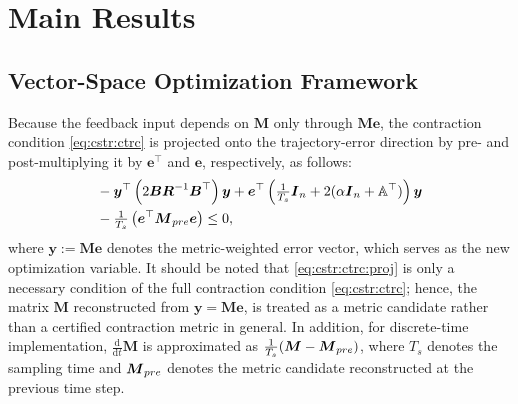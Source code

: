 \documentclass{ifacconf}
\newcommand*{\mv}[1]{\boldsymbol{#1}} %
\newcommand*{\mm}[1]{\boldsymbol{#1}} %
\newcommand\der{\mathrm d}
\newcommand*{\ddtt}{
   \tfrac{\der}{\der t}
}
\begin{document}
\section{Main Results} \label{sec:main:results}

\subsection{Vector-Space Optimization Framework} \label{sec:sub:vector:space:opt}

Because the feedback input depends on $\mm{M}$ only through $\mm{M}\mv{e}$, the contraction condition \eqref{eq:cstr:ctrc} is projected onto the trajectory-error direction by pre- and post-multiplying it by $\mv{e}^\top$ and $\mv{e}$, respectively, as follows:  
\begin{align} \nonumber
   &
   -
   \mv{y}^\top 
   \left(
      2\mm{B} 
      \mm{R}^{-1} 
      \mm{B}^\top
   \right)
   \mv{y}
   +
   \mv{e}^\top
   \left(
      \tfrac{1}{T_s}
      \mm{I}_n
      +
      2
      (
         \alpha
         \mm{I}_n
         +
      \mathbb{A}^\top
      )
   \right)
   \mv{y}
   \\ \label{eq:cstr:ctrc:proj}   
   &
   -
   \tfrac{1}{T_s}
   \left(
      \mv{e}^\top 
      \mm{M}_{\rm{pre}} 
      \mv{e}
   \right)
   \le 0
   ,
\end{align}
where $\mv{y}:=\mm{M}\mv{e}$ denotes the metric-weighted error vector, which serves as the new optimization variable.
It should be noted that \eqref{eq:cstr:ctrc:proj} is only a necessary condition of the full contraction condition \eqref{eq:cstr:ctrc}; hence, the matrix $\mm{M}$ reconstructed from $\mv{y}=\mm{M}\mv{e}$, is treated as a metric candidate rather than a certified contraction metric in general.
In addition, for discrete-time implementation, $\ddtt\mm{M}$ is approximated as $\tfrac{1}{T_s}(\mm{M}-\mm{M}_{\rm{pre}})$, where $T_s$ denotes the sampling time and $\mm{M}_{\rm{pre}}$ denotes the metric candidate reconstructed at the previous time step.
\end{document}
